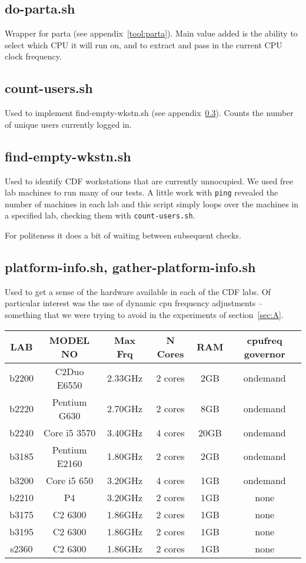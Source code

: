 \documentclass{article}
\begin{document}
\subsection{do-parta.sh} \label{tool:do-parta}
Wrapper for parta (see appendix~\ref{tool:parta}). Main value added is the
ability to select which CPU it will run on, and to extract and pass in the
current CPU clock frequency.

\subsection{count-users.sh} \label{tool:count-users.sh}
Used to implement find-empty-wkstn.sh (see appendix~\ref{tool:find-empty}).
Counts the number of unique users currently logged in.

\subsection{find-empty-wkstn.sh} \label{tool:find-empty}
Used to identify CDF workstations that are currently unnocupied. We used free
lab machines to run many of our tests. A little work with \lstinline{ping}
revealed the number of machines in each lab and this script simply loops over
the machines in a specified lab, checking them with \lstinline{count-users.sh}.

For politeness it does a bit of waiting between subsequent checks.

\subsection{platform-info.sh, gather-platform-info.sh} \label{tool:platform}
Used to get a sense of the hardware available in each of the CDF labs. Of
particular interest was the use of dynamic cpu frequency adjustments --
something that we were trying to avoid in the experiments of
section~\ref{sec:A}.

\begin{center}
    \begin{tabular}{ | c | c | c | c | c | c |}
    \hline
    LAB   & MODEL NO      & Max Frq & N Cores & RAM  & cpufreq governor \\
    \hline 
    b2200 & C2Duo E6550   & 2.33GHz & 2 cores &  2GB & ondemand \\
    b2220 & Pentium G630  & 2.70GHz & 2 cores &  8GB & ondemand \\
    b2240 & Core i5 3570  & 3.40GHz & 4 cores & 20GB & ondemand \\
    b3185 & Pentium E2160 & 1.80GHz & 2 cores &  2GB & ondemand \\
    b3200 & Core i5 650   & 3.20GHz & 4 cores &  1GB & ondemand \\
    \hline
    b2210 & P4            & 3.20GHz & 2 cores &  1GB & none \\
    b3175 & C2 6300       & 1.86GHz & 2 cores &  1GB & none \\
    b3195 & C2 6300       & 1.86GHz & 2 cores &  1GB & none \\
    s2360 & C2 6300       & 1.86GHz & 2 cores &  1GB & none \\
    \hline
\end{tabular}
\end{center}
\end{document}
